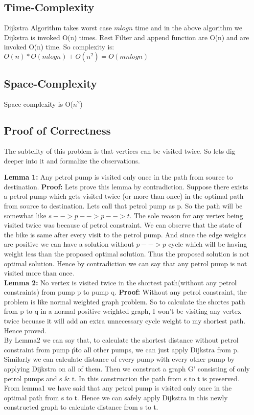 \documentclass{article}
\begin{document}
\subsection{Time-Complexity}
Dijkstra Algorithm takes worst case $mlogn$ time and in the above algorithm we Dijkstra is invoked O(n) times. 
Rest Filter and append function are O(n) and are invoked O(n) time. So complexity is: \\
\hspace*{1.5cm}$O(n)*O(mlogn) + O(n^2) = O(mnlogn)$

\subsection{Space-Complexity}
Space complexity is O($n^2$)

\subsection{Proof of Correctness}
The subtelity of this problem is that vertices can be visited twice. So lets dig deeper into it and formalize the observations.

\textbf{Lemma 1:} Any petrol pump is visited only once in the path from source to destination.
\textbf{Proof:} Lets prove this lemma by contradiction. Suppose there exists a petrol pump which gets visited twice (or more than once)
in the optimal path from source to destination. Lets call that petrol pump as p. So the path will be somewhat like $s-->p-->p-->t$.
The sole reason for any vertex being visited twice was because of petrol constraint.  
We can observe that the state of the bike is same after every visit to the petrol pump.
And since the edge weights are positive we can have a solution without $p-->p$ cycle which will be having weight less than the proposed optimal solution.
Thus the proposed solution is not optimal solution. Hence by contradiction we can say that any petrol pump is not visited more than once.
\\
\textbf{Lemma 2:} No vertex is visited twice in the shortest path(without any petrol constraints) from pump p to pump q.
\textbf{Proof:} Without any petrol constraint, the problem is like normal weighted graph problem. So to calculate the shortes path from p to
q in a normal positive weighted graph, I won't be visiting any vertex twice becuase it will add an extra unnecessary cycle weight to my shortest path. 
Hence proved.
\\
By Lemma2 we can say that, to calculate the shortest distance without petrol constraint from pump \'p\' to all other pumps, 
we can just apply Dijkstra from p. Similarly we can calculate distance of every pump with every other pump by applying Dijkstra on all of them.
Then we construct a graph G' consisting of only petrol pumps and s & t. In this construction the path from s to t is preserved. From lemma1 we have said that
any petrol pump is visited only once in the optimal path from s to t. Hence we can safely apply Dijkstra in this newly constructed graph to calculate distance
from s to t.
\end{document}

